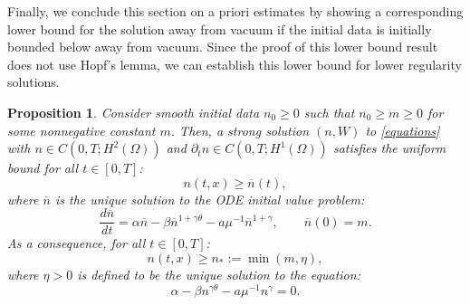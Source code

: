 \documentclass[12pt]{article}
\theoremstyle{plain}
\newtheorem{proposition}{Proposition}[section]
\begin{document}
Finally, we conclude this section on a priori estimates by showing a corresponding lower bound for the solution away from vacuum if the initial data is initially bounded below away from vacuum. Since the proof of this lower bound result does not use Hopf's lemma, we can establish this lower bound for lower regularity solutions.

\begin{proposition}\label{minprinciple}
Consider smooth initial data $n_{0} \ge 0$ such that $n_{0} \ge m \ge 0$ for some nonnegative constant $m$. Then, a strong solution $(n, W)$ to \eqref{equations} with $n \in C(0, T; H^{2}(\Omega))$ and $\partial_{t}n \in C(0, T; H^{1}(\Omega))$ satisfies the uniform bound for all $t \in [0, T]$:
\begin{equation*}
n(t, x) \ge \overline{n}(t),
\end{equation*}
where $\overline{n}$ is the unique solution to the ODE initial value problem:
\begin{equation*}
\frac{d\overline{n}}{dt} = \alpha \overline{n} - \beta \overline{n}^{1 + \gamma \theta} - a\mu^{-1} \overline{n}^{1 + \gamma}, \qquad \overline{n}(0) = m.
\end{equation*}
As a consequence, for all $t \in [0, T]$:
\begin{equation*}
n(t, x) \ge n_{*} := \min(m, \eta),
\end{equation*}
where $\eta > 0$ is defined to be the unique solution to the equation:
\begin{equation}\label{nlowerstar}
\alpha - \beta n^{\gamma \theta} - a\mu^{-1}n^{\gamma} = 0.
\end{equation}
\end{proposition}
\end{document}
